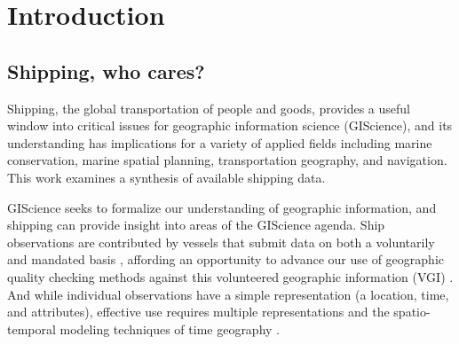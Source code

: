 \section{Introduction}


\subsection{Shipping, who cares?}

Shipping, the global transportation of people and goods, provides a useful window into critical issues for geographic information science (GIScience), and its understanding has implications for a variety of applied fields including marine conservation, marine spatial planning, transportation geography, and navigation.  This work examines a synthesis of available shipping data.

GIScience seeks to formalize our understanding of geographic information, and shipping can provide insight into areas of the GIScience agenda. Ship observations are contributed by vessels that submit data on both a voluntarily and mandated basis \citep{VOSClim,Tetreault2002}, affording an opportunity to advance our use of geographic quality checking methods \citep{goodchildli2012} against this volunteered geographic information (VGI) \citep{goodchild2007citizens}. And while individual observations have a simple representation (a location, time, and attributes), effective use requires multiple representations \citep{Goodchild1992} and the spatio-temporal modeling techniques of time geography \citep{miller2008field}.

